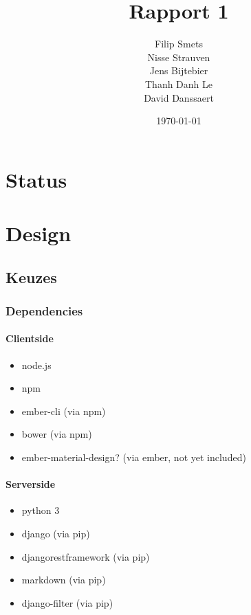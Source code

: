 \documentclass[11pt]{article}
\title{\textbf{Rapport 1}}
\author{Filip Smets\\
		Nisse Strauven\\
		Jens Bijtebier\\
		Thanh Danh Le\\
		David Danssaert}
\date{\today}
\begin{document}
\maketitle

\tableofcontents

\section{Status}
\section{Design}
  \subsection{Keuzes}
  \subsubsection{Dependencies}
  \paragraph{Clientside}
  \begin{itemize}
  \item node.js
  \item npm
  \item ember-cli (via npm)
  \item bower (via npm)
  \item ember-material-design? (via ember, not yet included)
  \end{itemize}

  \paragraph{Serverside}
  \begin{itemize}
  \item python 3
  \item django (via pip)
  \item djangorestframework (via pip)
  \item markdown (via pip)
  \item django-filter (via pip)
  \end{itemize}
\end{document}

